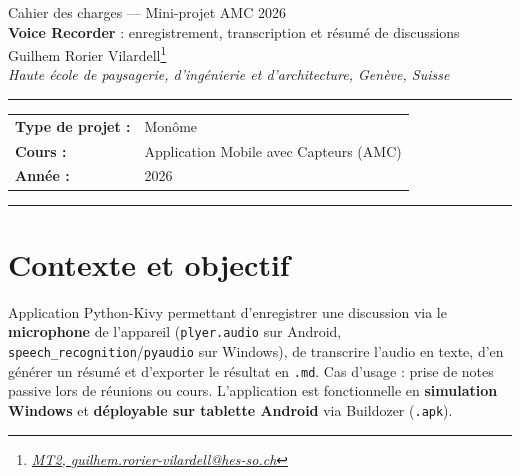 \documentclass[a4paper,10pt]{article}
\begin{document}
\begin{center}
\vspace*{0mm}
{\large
Cahier des charges --- Mini-projet AMC 2026\\
\vspace{2mm}
\textbf{Voice Recorder} : enregistrement, transcription et résumé de discussions
}\\
\vspace{5mm}
Guilhem Rorier Vilardell\footnote{\textit{\href{mailto:guilhem.rorier-vilardell@hes-so.ch}{MT2, guilhem.rorier-vilardell@hes-so.ch}}}\\
\vspace{2mm}
\footnotesize{\textit{Haute école de paysagerie, d'ingénierie et d'architecture, Genève, Suisse}}\\
\vspace{3mm}
\end{center}

\rule{\linewidth}{0.4pt}

\begin{center}
\begin{tabular}{ll}
\textbf{Type de projet :} & Monôme \\
\textbf{Cours :}          & Application Mobile avec Capteurs (AMC) \\
\textbf{Année :}          & 2026 \\
\end{tabular}
\end{center}

\rule{\linewidth}{0.4pt}

\vspace{3mm}
\setlength{\parskip}{2pt}

\section{Contexte et objectif}

Application Python-Kivy permettant d'enregistrer une discussion via le \textbf{microphone} de l'appareil (\texttt{plyer.audio} sur Android, \texttt{speech\_recognition}/\texttt{pyaudio} sur Windows), de transcrire l'audio en texte, d'en générer un résumé et d'exporter le résultat en \texttt{.md}. Cas d'usage : prise de notes passive lors de réunions ou cours. L'application est fonctionnelle en \textbf{simulation Windows} et \textbf{déployable sur tablette Android} via Buildozer (\texttt{.apk}).
\end{document}
